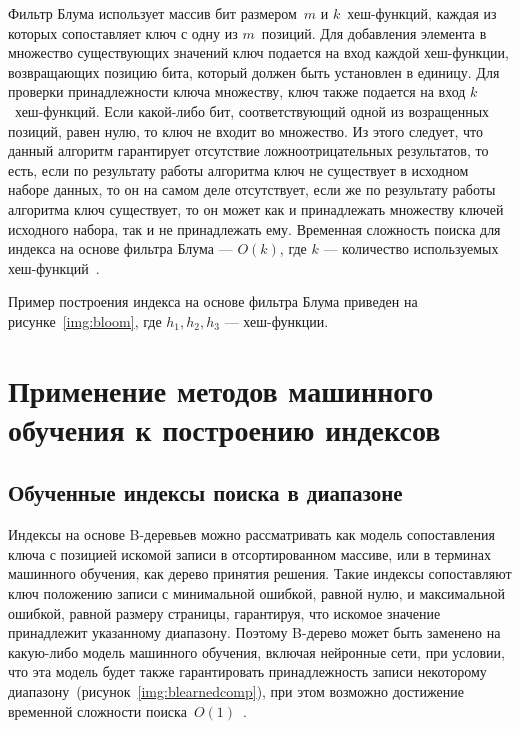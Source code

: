 Фильтр Блума использует массив бит размером~$m$ и $k$~хеш-функций, каждая из
которых сопоставляет ключ с одну из $m$~позиций. Для добавления элемента в
множество существующих значений ключ подается на вход каждой хеш-функции,
возвращающих позицию бита, который должен быть установлен в единицу. Для
проверки принадлежности ключа множеству, ключ также подается на вход
$k$~хеш-функций.  Если какой-либо бит, соответствующий одной из возращенных
позиций, равен нулю, то ключ не входит во множество. Из этого следует, что
данный алгоритм гарантирует отсутствие ложноотрицательных результатов, то есть,
если по результату работы алгоритма ключ не существует в исходном наборе данных,
то он на самом деле отсутствует, если же по результату работы алгоритма ключ
существует, то он может как и принадлежать множеству ключей исходного набора,
так и не принадлежать ему. Временная сложность поиска для индекса на основе
фильтра Блума --- $O(k)$, где $k$ --- количество используемых
хеш-функций~\cite{ship}.

Пример построения индекса на основе фильтра Блума приведен на
рисунке~\ref{img:bloom}, где $h_1, h_2, h_3$ --- хеш-функции.


\section{Применение методов машинного обучения к построению индексов}

\subsection{Обученные индексы поиска в диапазоне}

Индексы на основе B-деревьев можно рассматривать как модель сопоставления ключа
с позицией искомой записи в отсортированном массиве, или в терминах машинного
обучения, как дерево принятия решения. Такие индексы сопоставляют ключ положению
записи с минимальной ошибкой, равной нулю, и максимальной ошибкой, равной
размеру страницы, гарантируя, что искомое значение принадлежит указанному
диапазону. Поэтому B-дерево может быть заменено на какую-либо модель машинного
обучения, включая нейронные сети, при условии, что эта модель будет также
гарантировать принадлежность записи некоторому
диапазону~(рисунок~\ref{img:blearnedcomp}), при этом возможно достижение
временной сложности поиска~$O(1)$~\cite{main}.


